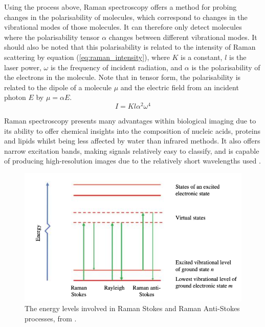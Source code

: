 Using the process above, Raman spectroscopy offers a method for probing changes in the polarisability of molecules, which correspond to changes in the vibrational modes of those molecules. It can therefore only detect molecules where the polarisability tensor $\alpha$ changes between different vibrational modes. It should also be noted that this polarisability is related to the intensity of Raman scattering by equation (\ref{eq:raman_intensity}), where $K$ is a constant, $l$ is the laser power, $\omega$ is the frequency of incident radiation, and $\alpha$ is the polarisability of the electrons in the molecule. Note that in tensor form, the polarisability is related to the dipole of a molecule $\mu$ and the electric field from an incident photon $E$ by $\mu=\alpha E$.\\
\begin{equation} \label{eq:raman_intensity}
    I=Kl\alpha^2 \omega^4
\end{equation}

Raman spectroscopy presents many advantages within biological imaging due to its ability to offer chemical insights into the composition of nucleic acids, proteins and lipids \cite{shen_recent_2021} whilst being less affected by water than infrared methods. It also offers narrow excitation bands, making signals relatively easy to classify, and is capable of producing high-resolution images due to the relatively short wavelengths used \cite{xu_raman_2025}.\\


\begin{figure}
    \centering
    \includegraphics[width=1\linewidth]{Images/raman_energy_levels.png}
    \caption{The energy levels involved in Raman Stokes and Raman Anti-Stokes processes, from \cite{smith_modern_2019}.}
    \label{fig:raman_energy_levels}
\end{figure}

